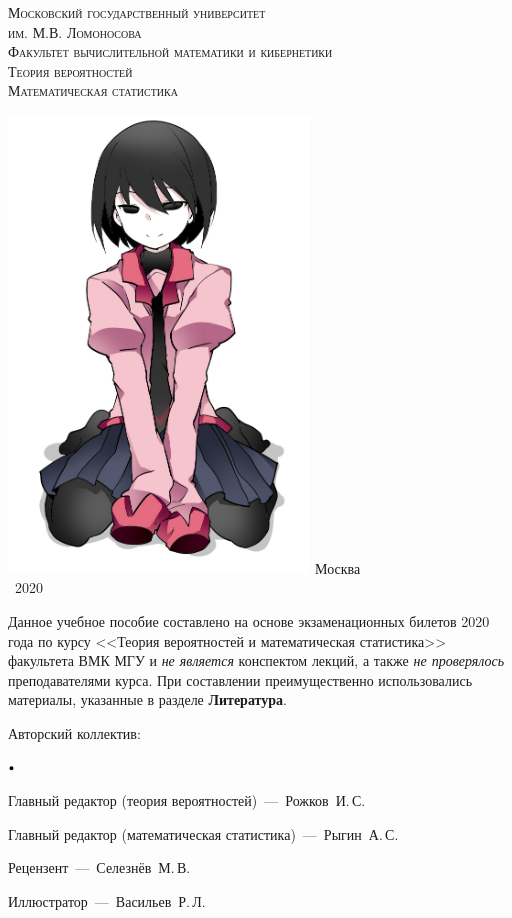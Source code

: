 \documentclass[oneside,final,14pt]{extreport}
\theoremstyle{plain}
\theoremstyle{definition}
\theoremstyle{named}
\newcommand\sbullet[1][.5]{\mathbin{\vcenter{\hbox{\scalebox{#1}{$\bullet$}}}}}
\newenvironment{compactlist}{
\begin{list}{{$\sbullet[.75]$}}{
\setlength\partopsep{0pt}
\setlength\parskip{0pt}
\setlength\parsep{0pt}
\setlength\topsep{0pt}
\setlength\itemsep{0pt}
}
}{
\end{list}
}
\begin{document}
\begin{titlepage}
    \centering
    \vfill
    {\scshape\large
        Московский государственный университет\\
        им. М.В. Ломоносова\\
        Факультет вычислительной математики и кибернетики\\
   }
    \vskip1cm
    {\scshape\huge
        Теория вероятностей\\
        Математическая статистика\\
   }

    \vfill
    \includegraphics[width=8cm]{pic.png}
    \vfill
    {\upshape\large
        Москва\\
        ~2020
   }
\end{titlepage}

\newpage
Данное учебное пособие составлено на основе экзаменационных билетов 2020 года по курсу <<Теория вероятностей и математическая статистика>> факультета ВМК МГУ и \textit{не является} конспектом лекций, а также \textit{не проверялось} преподавателями курса. При составлении преимущественно использовались материалы, указанные в разделе \textbf{Литература}.

\vspace{5mm}

Авторский коллектив:
\begin{compactlist}
    \item Главный редактор (теория вероятностей)~---~Рожков~И.\,С.
    \item Главный редактор (математическая статистика)~---~Рыгин~А.\,С.
    \item Рецензент~---~Селезнёв~М.\,В.
    \item Иллюстратор~---~Васильев~Р.\,Л.
\end{compactlist}
\end{document}
